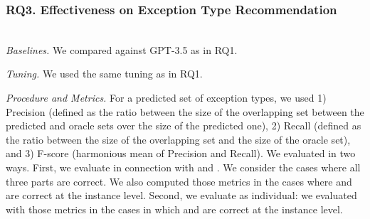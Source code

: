 \subsubsection{RQ3. Effectiveness on Exception Type Recommendation}~\\
{\em Baselines.} We compared {\xtype} against GPT-3.5 as in RQ1.





{\em Tuning.} We used the same tuning as in RQ1.

{\em Procedure and Metrics.} For a predicted set of exception types,
we used 1) Precision (defined as the ratio between the size of the
overlapping set between the predicted and oracle sets over the size of
the predicted one), 2) Recall (defined as the ratio between the size of
the overlapping set and the size of the oracle set), and 3) F-score
(harmonious mean of Precision and Recall). We evaluated {\tool} in two
ways. First, we evaluate {\xtype} in connection with {\xblock} and
{\xstate}. We consider the cases where all three parts are correct.
We also computed those metrics in the cases where {\xblock} and
{\xstate} are correct at the instance level. Second, we evaluate
{\xtype} as individual: we evaluated {\xtype} with those metrics in
the cases in which {\xblock} and {\xstate} are correct at the instance
level.


